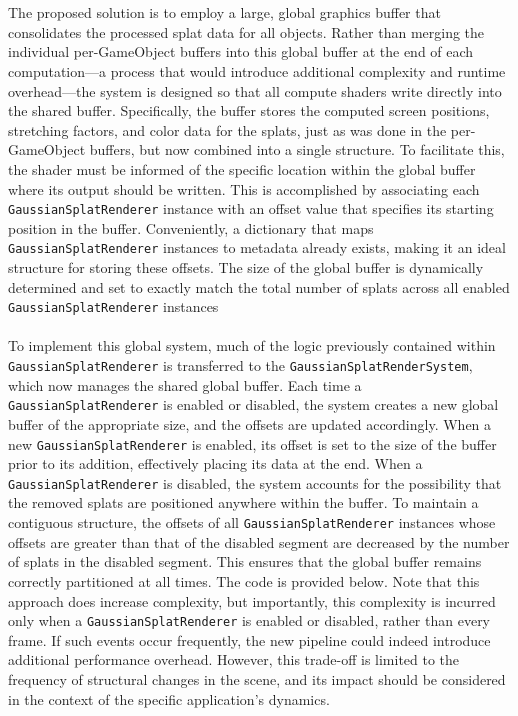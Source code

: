 \documentclass[12pt]{article}
\begin{document}
\\\\
The proposed solution is to employ a large, global graphics buffer that consolidates the processed splat data for all objects. Rather than merging the individual per-GameObject buffers into this global buffer at the end of each computation—a process that would introduce additional complexity and runtime overhead—the system is designed so that all compute shaders write directly into the shared buffer. Specifically, the buffer stores the computed screen positions, stretching factors, and color data for the splats, just as was done in the per-GameObject buffers, but now combined into a single structure. To facilitate this, the shader must be informed of the specific location within the global buffer where its output should be written. This is accomplished by associating each \texttt{GaussianSplatRenderer} instance with an offset value that specifies its starting position in the buffer. Conveniently, a dictionary that maps \texttt{GaussianSplatRenderer} instances to metadata already exists, making it an ideal structure for storing these offsets. The size of the global buffer is dynamically determined and set to exactly match the total number of splats across all enabled \texttt{GaussianSplatRenderer} instances\\\\
To implement this global system, much of the logic previously contained within \texttt{GaussianSplatRenderer} is transferred to the \linebreak \texttt{GaussianSplatRenderSystem}, which now manages the shared global buffer. Each time a \texttt{GaussianSplatRenderer} is enabled or disabled, the system creates a new global buffer of the appropriate size, and the offsets are updated accordingly. When a new \texttt{GaussianSplatRenderer} is enabled, its offset is set to the size of the buffer prior to its addition, effectively placing its data at the end. When a \texttt{GaussianSplatRenderer} is disabled, the system accounts for the possibility that the removed splats are positioned anywhere within the buffer. To maintain a contiguous structure, the offsets of all \texttt{GaussianSplatRenderer} instances whose offsets are greater than that of the disabled segment are decreased by the number of splats in the disabled segment. This ensures that the global buffer remains correctly partitioned at all times. The code is provided below. Note that this approach does increase complexity, but importantly, this complexity is incurred only when a \texttt{GaussianSplatRenderer} is enabled or disabled, rather than every frame. If such events occur frequently, the new pipeline could indeed introduce additional performance overhead. However, this trade-off is limited to the frequency of structural changes in the scene, and its impact should be considered in the context of the specific application’s dynamics.
\end{document}
